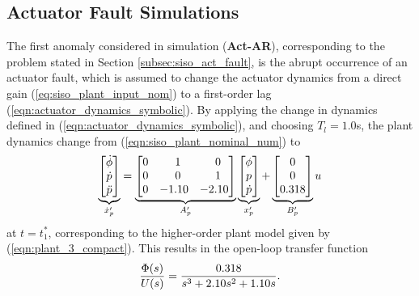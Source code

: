 \subsection{Actuator Fault Simulations}\label{subsec:siso_act_sims}
The first anomaly considered in simulation (\textbf{Act-AR}), corresponding to the problem stated in Section \ref{subsec:siso_act_fault}, is the abrupt occurrence of an actuator fault, which is assumed to change the actuator dynamics from a direct gain (\ref{eq:siso_plant_input_nom}) to a first-order lag (\ref{eqn:actuator_dynamics_symbolic}). By applying the change in dynamics defined in (\ref{eqn:actuator_dynamics_symbolic}), and choosing $T_l = 1.0$s, the plant dynamics change from (\ref{eqn:siso_plant_nominal_num}) to
\begin{equation}
	\underbrace{\begin{bmatrix}
			\dot{\phi} \\ \dot{p} \\ \ddot{p}
		\end{bmatrix}}_{\dot{x}_p'} = \underbrace{\begin{bmatrix}
		0 & \hfil 1 & \hfil 0\\ 0 & \hfil 0 & \hfil 1 \\ 0 & -1.10 & -2.10
	\end{bmatrix}}_{A_p'} \underbrace{\begin{bmatrix}
			\phi \\ p \\ \dot{p}
		\end{bmatrix}}_{x_p'} + \underbrace{\begin{bmatrix}
		0 \\ 0 \\ 0.318
	\end{bmatrix}}_{B_p'} u
	\label{eqn:plant_3}
\end{equation}
\noindent at $t = t_1^*$, corresponding to the higher-order plant model given by (\ref{eqn:plant_3_compact}). This results in the open-loop transfer function
\begin{equation}
		\frac{\Phi(s)}{U(s)} = \frac{0.318}{s^3 + 2.10s^2 + 1.10s}.\\
\end{equation}

